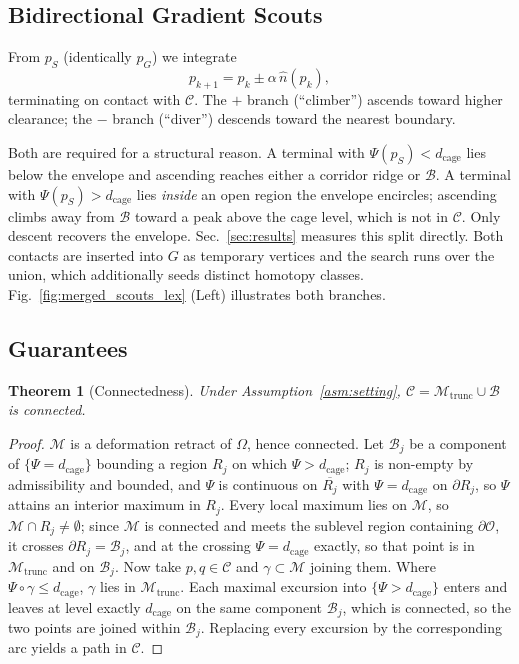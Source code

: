 \documentclass[conference]{IEEEtran}
\newtheorem{theorem}{Theorem}
\begin{document}
\subsection{Bidirectional Gradient Scouts}

From $p_S$ (identically $p_G$) we integrate
\begin{equation}
p_{k+1}=p_k \pm \alpha\,\hat{n}(p_k),
\label{eq:scout}
\end{equation}
terminating on contact with $\mathcal{C}$. The $+$ branch (``climber'') ascends toward higher clearance; the $-$ branch (``diver'') descends toward the nearest boundary.

Both are required for a structural reason. A terminal with $\Psi(p_S)<d_{\mathrm{cage}}$ lies below the envelope and ascending reaches either a corridor ridge or $\mathcal{B}$. A terminal with $\Psi(p_S)>d_{\mathrm{cage}}$ lies \emph{inside} an open region the envelope encircles; ascending climbs away from $\mathcal{B}$ toward a peak above the cage level, which is not in $\mathcal{C}$. Only descent recovers the envelope. Sec.~\ref{sec:results} measures this split directly. Both contacts are inserted into $G$ as temporary vertices and the search runs over the union, which additionally seeds distinct homotopy classes. Fig.~\ref{fig:merged_scouts_lex} (Left) illustrates both branches.



\subsection{Guarantees}

\begin{theorem}[Connectedness]
\label{thm:connected}
Under Assumption~\ref{asm:setting}, $\mathcal{C}=\mathcal{M}_{\mathrm{trunc}}\cup\mathcal{B}$ is connected.
\end{theorem}
\begin{proof}
$\mathcal{M}$ is a deformation retract of $\Omega$, hence connected. Let $\mathcal{B}_j$ be a component of $\{\Psi=d_{\mathrm{cage}}\}$ bounding a region $R_j$ on which $\Psi>d_{\mathrm{cage}}$; $R_j$ is non-empty by admissibility and bounded, and $\Psi$ is continuous on $\overline{R_j}$ with $\Psi=d_{\mathrm{cage}}$ on $\partial R_j$, so $\Psi$ attains an interior maximum in $R_j$. Every local maximum lies on $\mathcal{M}$, so $\mathcal{M}\cap R_j\neq\emptyset$; since $\mathcal{M}$ is connected and meets the sublevel region containing $\partial\mathcal{O}$, it crosses $\partial R_j=\mathcal{B}_j$, and at the crossing $\Psi=d_{\mathrm{cage}}$ exactly, so that point is in $\mathcal{M}_{\mathrm{trunc}}$ and on $\mathcal{B}_j$. Now take $p,q\in\mathcal{C}$ and $\gamma\subset\mathcal{M}$ joining them. Where $\Psi\circ\gamma\le d_{\mathrm{cage}}$, $\gamma$ lies in $\mathcal{M}_{\mathrm{trunc}}$. Each maximal excursion into $\{\Psi>d_{\mathrm{cage}}\}$ enters and leaves at level exactly $d_{\mathrm{cage}}$ on the same component $\mathcal{B}_j$, which is connected, so the two points are joined within $\mathcal{B}_j$. Replacing every excursion by the corresponding arc yields a path in $\mathcal{C}$.
\end{proof}
\end{document}
